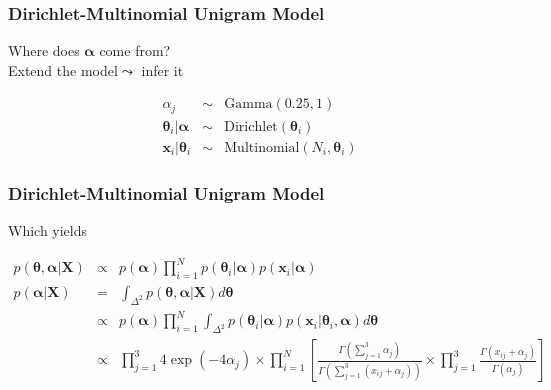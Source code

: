 \documentclass{beamer}
\numberwithin{equation}{section}
\begin{document}
\begin{frame}
\frametitle{Dirichlet-Multinomial Unigram Model}

Where does $\boldsymbol{\alpha}$ come from?\\
Extend the model$\leadsto$ \alert{infer} it

\begin{eqnarray}
\alpha_{j} & \sim & \text{Gamma}(0.25, 1) \nonumber \\
\boldsymbol{\theta}_{i}|\boldsymbol{\alpha} & \sim & \text{Dirichlet}(\boldsymbol{\theta}_{i}) \nonumber \\
\boldsymbol{x}_{i}| \boldsymbol{\theta}_{i} & \sim & \text{Multinomial}(N_{i}, \boldsymbol{\theta}_{i} ) \nonumber 
\end{eqnarray}



\end{frame}

\begin{frame}
\frametitle{Dirichlet-Multinomial Unigram Model}

Which yields
\begin{footnotesize}
\begin{eqnarray}
p(\boldsymbol{\theta}, \boldsymbol{\alpha} | \boldsymbol{X}) & \propto &  p(\boldsymbol{\alpha}) \prod_{i=1}^{N} p(\boldsymbol{\theta}_{i} | \boldsymbol{\alpha}) p(\boldsymbol{x}_{i} | \boldsymbol{\alpha})  \nonumber \\
p(\boldsymbol{\alpha}|\boldsymbol{X}) & = & \int_{\Delta^{2}} p(\boldsymbol{\theta}, \boldsymbol{\alpha} | \boldsymbol{X})  d\boldsymbol{\theta}  \nonumber \\
& \propto & 
p(\boldsymbol{\alpha}) \prod_{i=1}^{N} \int_{\Delta^{2}} p(\boldsymbol{\theta}_{i} | \boldsymbol{\alpha}) p(\boldsymbol{x}_{i} |\boldsymbol{\theta}_{i}, \boldsymbol{\alpha})d\boldsymbol{\theta} \nonumber \\
& \propto & \prod_{j=1}^{3} 4 \exp\left( - 4 \alpha_{j}  \right)  \times \prod_{i=1}^{N}\left[\frac{\Gamma(\sum_{j=1}^{3} \alpha_{j} )}{\Gamma(\sum_{j=1}^{3} (x_{ij} + \alpha_{j} ))}\times \prod_{j=1}^{3} \frac{\Gamma(x_{ij} + \alpha_{j}) }{\Gamma(\alpha_{j} )   }\right] \nonumber 
\end{eqnarray}
\end{footnotesize}




\end{frame}
\end{document}
